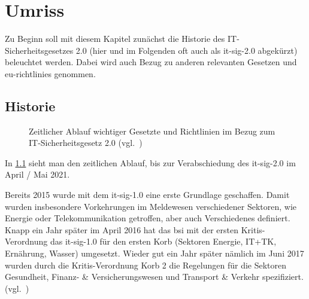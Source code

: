 \chapter{Umriss}\label{ch:umriss}
Zu Beginn soll mit diesem Kapitel zunächst die Historie des IT-Sicherheitsgesetzes 2.0 (hier und im Folgenden oft auch als \acrshort{it-sig-2.0} abgekürzt) beleuchtet werden.
Dabei wird auch Bezug zu anderen relevanten Gesetzen und \glspl{eu-richtlinie} genommen.

\section{Historie}\label{sec:historie}


\begin{figure}[H]\centering
    \startchronology[startyear=2015, stopyear=2021, color=lightgray, height=7ex]
    \stopchronology
    \caption{Zeitlicher Ablauf wichtiger Gesetzte und Richtlinien im Bezug zum IT-Sicherheitsgesetz 2.0 (vgl.~\cite{briefing-it-sig-2.0})}
    \label{fig:historie-it-sig-2.0}
\end{figure}

In \cref{fig:historie-it-sig-2.0} sieht man den zeitlichen Ablauf, bis zur Verabschiedung des \acrshort{it-sig-2.0} im April / Mai 2021.

Bereits 2015 wurde mit dem \acrshort{it-sig-1.0} eine erste Grundlage geschaffen.
Damit wurden insbesondere Vorkehrungen im Meldewesen verschiedener Sektoren, wie Energie oder Telekommunikation getroffen,
aber auch Verschiedenes definiert.
Knapp ein Jahr später im April 2016 hat das \acrshort{bsi} mit der ersten Kritis-Verordnung das \acrshort{it-sig-1.0}
für den ersten Korb (Sektoren Energie, IT+TK, Ernährung, Wasser) umgesetzt.
Wieder gut ein Jahr später nämlich im Juni 2017 wurden durch die Kritis-Verordnung Korb 2 die Regelungen für die Sektoren
Gesundheit, Finanz- \& Versicherungswesen und Transport \& Verkehr spezifiziert.
(vgl.~\cite{kritis-gesetzgebung,umsetzung-it-sig-1.0-bsi})

